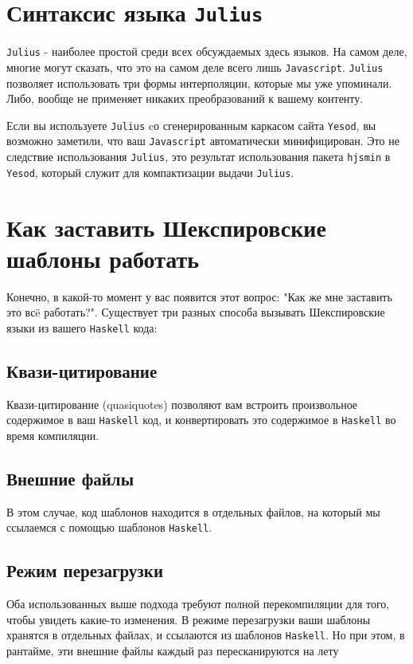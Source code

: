 \section{Синтаксис языка \texttt{Julius}}

\texttt{Julius} - наиболее простой среди всех обсуждаемых здесь языков. На самом деле,
многие могут сказать, что это на самом деле всего лишь \texttt{Javascript}. \texttt{Julius}
позволяет использовать три формы интерполяции, которые мы уже упоминали.
Либо, вообще не применяет никаких преобразований к вашему контенту.

\begin{remark}
Если вы используете \texttt{Julius} cо сгенерированным каркасом сайта \texttt{Yesod}, вы возможно заметили, что ваш
\texttt{Javascript} автоматически минифицирован. Это не следствие использования \texttt{Julius}, это
результат использования пакета \lstinline!hjsmin! в \texttt{Yesod}, который служит для компактизации
выдачи \texttt{Julius}.
\end{remark}

\section{Как заставить Шекспировские шаблоны работать}

Конечно, в какой-то момент у вас появится этот вопрос: "Как же мне заставить это
всë работать?". Существует три разных способа вызывать Шекспировские языки
из вашего \texttt{Haskell} кода:

\subsection{Квази-цитирование}
Квази-цитирование (quasiquotes) позволяют вам встроить произвольное содержимое в ваш \texttt{Haskell} код, и
конвертировать это содержимое в \texttt{Haskell} во время компиляции.

\subsection {Внешние файлы}
В этом случае, код шаблонов находится в отдельных файлов, на который мы ссылаемся
с помощью шаблонов \texttt{Haskell}.

\subsection {Режим перезагрузки}
Оба использованных выше подхода требуют полной перекомпиляции для того, чтобы увидеть
какие-то изменения. В режиме перезагрузки ваши шаблоны хранятся в отдельных файлах,
и ссылаются из шаблонов \texttt{Haskell}. Но при этом, в рантайме, эти внешние файлы
каждый раз пересканируются на лету

